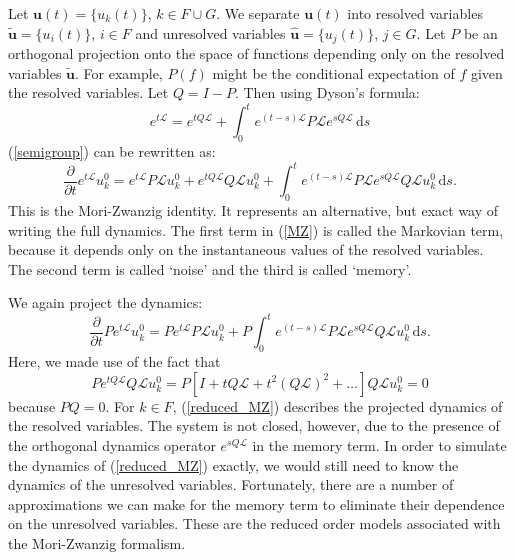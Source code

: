 \documentclass{article}
\begin{document}
Let $\mathbf{u}(t) = \{u_k(t)\}$, $k\in F\cup G$. We separate $\mathbf{u}(t)$ into resolved variables $\tilde{\mathbf{u}}=\{u_i(t)\}$, $i\in F$ and unresolved variables $\hat{\mathbf{u}}=\{u_j(t)\}$, $j\in G$. Let $P$ be an orthogonal projection onto the space of functions depending only on the resolved variables $\tilde{\mathbf{u}}$. For example, $P(f)$ might be the conditional expectation of $f$ given the resolved variables. Let $Q=I-P$. Then using Dyson's formula:
\begin{equation}
e^{t\mathcal{L}}=e^{tQ\mathcal{L}}+\int_0^t e^{(t-s)\mathcal{L}}P\mathcal{L}e^{sQ\mathcal{L}}\,\mathrm{d}s \label{dyson}
\end{equation}(\ref{semigroup}) can be rewritten as:
\begin{equation}
\frac{\partial}{\partial t}e^{t\mathcal{L}}u_k^0 = e^{t\mathcal{L}}P\mathcal{L}u_k^0 +e^{tQ\mathcal{L}}Q\mathcal{L}u_k^0 + \int_0^t e^{(t-s)\mathcal{L}}P\mathcal{L}e^{sQ\mathcal{L}}Q\mathcal{L}u_k^0\,\mathrm{d}s.\label{MZ}
\end{equation}This is the Mori-Zwanzig identity. It represents an alternative, but exact way of writing the full dynamics. The first term in (\ref{MZ}) is called the Markovian term, because it depends only on the instantaneous values of the resolved variables. The second term is called `noise' and the third is called `memory'.

We again project the dynamics:
\begin{equation}
\frac{\partial }{\partial t}Pe^{t\mathcal{L}}u_k^0 = Pe^{t\mathcal{L}}P\mathcal{L}u_k^0+P\int_0^te^{(t-s)\mathcal{L}}P\mathcal{L}e^{sQ\mathcal{L}}Q\mathcal{L}u_k^0\,\mathrm{d}s.\label{reduced_MZ}
\end{equation}Here, we made use of the fact that
\[Pe^{tQ\mathcal{L}}Q\mathcal{L}u_k^0= P\left[I+tQ\mathcal{L}+t^2(Q\mathcal{L})^2+\dots\right]Q\mathcal{L}u_k^0 = 0
\]because $PQ=0$. For $k\in F$, (\ref{reduced_MZ}) describes the projected dynamics of the resolved variables. The system is not closed, however, due to the presence of the orthogonal dynamics operator $e^{sQ\mathcal{L}}$ in the memory term. In order to simulate the dynamics of (\ref{reduced_MZ}) exactly, we would still need to know the dynamics of the unresolved variables. Fortunately, there are a number of approximations we can make for the memory term to eliminate their dependence on the unresolved variables. These are the reduced order models associated with the Mori-Zwanzig formalism.

\end{document}

